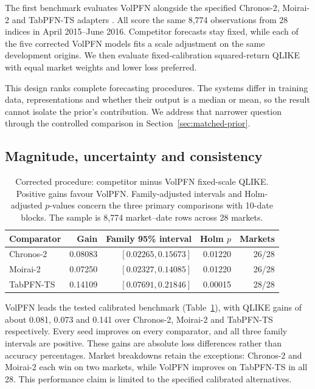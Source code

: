 The first benchmark evaluates VolPFN alongside the specified Chronos-2, Moirai-2 and TabPFN-TS adapters \citep{ansari2025chronos2,liu2025moirai2,hoo2025tables}. All score the same 8,774 observations from 28 indices in April 2015--June 2016. Competitor forecasts stay fixed, while each of the five corrected VolPFN models fits a scale adjustment on the same development origins. We then evaluate fixed-calibration squared-return QLIKE with equal market weights and lower loss preferred.

This design ranks complete forecasting procedures. The systems differ in training data, representations and whether their output is a median or mean, so the result cannot isolate the prior's contribution. We address that narrower question through the controlled comparison in Section~\ref{sec:matched-prior}.

\subsection{Magnitude, uncertainty and consistency}

\begin{table}[!htbp]
\centering\small
\caption[Corrected five-model benchmark]{Corrected procedure: competitor minus VolPFN fixed-scale QLIKE. Positive gains favour VolPFN. Family-adjusted intervals and Holm-adjusted $p$-values concern the three primary comparisons with 10-date blocks. The sample is 8,774 market--date rows across 28 markets.}
\label{tab:corrected-benchmark}
\begin{tabular}{lrrrr}
\toprule
Comparator & Gain & Family 95\% interval & Holm $p$ & Markets \\
\midrule
Chronos-2 & 0.08083 & $[0.02265,0.15673]$ & 0.01220 & 26/28 \\
Moirai-2 & 0.07250 & $[0.02327,0.14085]$ & 0.01220 & 26/28 \\
TabPFN-TS & 0.14109 & $[0.07691,0.21846]$ & 0.00015 & 28/28 \\
\bottomrule
\end{tabular}
\end{table}

VolPFN leads the tested calibrated benchmark (Table~\ref{tab:corrected-benchmark}), with QLIKE gains of about 0.081, 0.073 and 0.141 over Chronos-2, Moirai-2 and TabPFN-TS respectively. Every seed improves on every comparator, and all three family intervals are positive. These gains are absolute loss differences rather than accuracy percentages. Market breakdowns retain the exceptions: Chronos-2 and Moirai-2 each win on two markets, while VolPFN improves on TabPFN-TS in all 28. This performance claim is limited to the specified calibrated alternatives.

